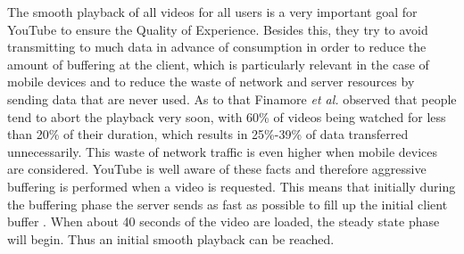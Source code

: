 The smooth playback of all videos for all users is a very important goal for YouTube to ensure the Quality of Experience. Besides this, they try to avoid transmitting to much data in advance of consumption in order to reduce the amount of buffering at the client, which is particularly relevant in the case of mobile devices and to reduce the waste of network and server resources by sending data that are never used. As to that Finamore \emph{et al.} \cite{inpr:youtube_everywhere} observed that people tend to abort the playback very soon, with 60\% of videos being watched for less than 20\% of their duration, which results in 25\%-39\% of data transferred unnecessarily. This waste of network traffic is even higher when mobile devices are considered. YouTube is well aware of these facts and therefore aggressive buffering is performed when a video is requested. This means that initially during the buffering phase the server sends as fast as possible to fill up the initial client buffer \cite{inp:network_characteristics}. When about 40 seconds of the video are loaded, the steady state phase will begin. Thus an initial smooth playback can be reached.


